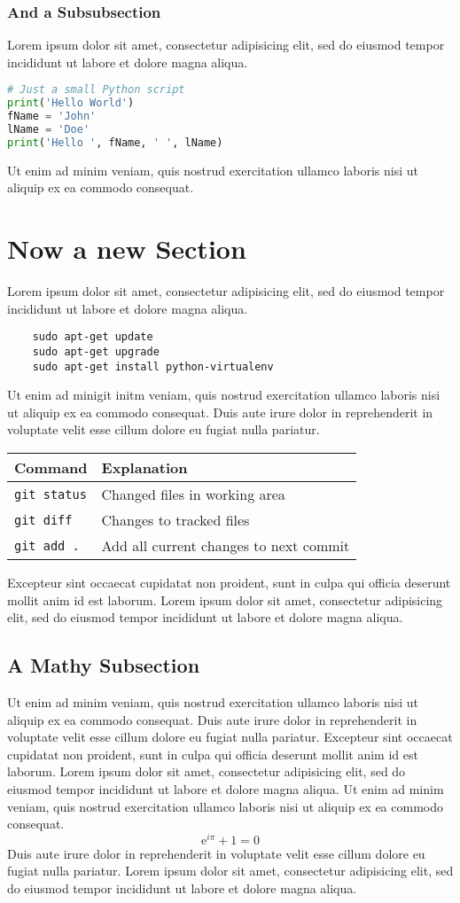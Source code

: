 \documentclass{modernCS}
\begin{document}
\subsubsection{And a Subsubsection}
Lorem ipsum dolor sit amet, consectetur adipisicing elit, sed do eiusmod
tempor incididunt ut labore et dolore magna aliqua.
\begin{lstlisting}[language=Python]
# Just a small Python script
print('Hello World')
fName = 'John'
lName = 'Doe'
print('Hello ', fName, ' ', lName)
\end{lstlisting}
Ut enim ad minim veniam,
quis nostrud exercitation ullamco laboris nisi ut aliquip ex ea commodo
consequat.

\section{Now a new Section}
Lorem ipsum dolor sit amet, consectetur adipisicing elit, sed do eiusmod
tempor incididunt ut labore et dolore magna aliqua.
\begin{lstlisting}
	sudo apt-get update
	sudo apt-get upgrade
	sudo apt-get install python-virtualenv
\end{lstlisting}
Ut enim ad minigit initm veniam,
quis nostrud exercitation ullamco laboris nisi ut aliquip ex ea commodo
consequat. Duis aute irure dolor in reprehenderit in voluptate velit esse
cillum dolore eu fugiat nulla pariatur.
\begin{center}
\begin{tabular}{ll}
\toprule
Command & Explanation \\
\midrule
\verb+git status+ & Changed files in working area \\
\verb+git diff+ & Changes to tracked files \\
\verb+git add .+ & Add all current changes to next commit \\
\bottomrule
\end{tabular}
\end{center}
Excepteur sint occaecat cupidatat non
proident, sunt in culpa qui officia deserunt mollit anim id est laborum.
Lorem ipsum dolor sit amet, consectetur adipisicing elit, sed do eiusmod
tempor incididunt ut labore et dolore magna aliqua.
\subsection{A Mathy Subsection}
Ut enim ad minim veniam,
quis nostrud exercitation ullamco laboris nisi ut aliquip ex ea commodo
consequat. Duis aute irure dolor in reprehenderit in voluptate velit esse
cillum dolore eu fugiat nulla pariatur. Excepteur sint occaecat cupidatat non
proident, sunt in culpa qui officia deserunt mollit anim id est laborum.
Lorem ipsum dolor sit amet, consectetur adipisicing elit, sed do eiusmod
tempor incididunt ut labore et dolore magna aliqua. Ut enim ad minim veniam,
quis nostrud exercitation ullamco laboris nisi ut aliquip ex ea commodo
consequat.
\[
\mathrm{e}^{i\pi} + 1 = 0
\]
Duis aute irure dolor in reprehenderit in voluptate velit esse
cillum dolore eu fugiat nulla pariatur.
Lorem ipsum dolor sit amet, consectetur adipisicing elit, sed do eiusmod
tempor incididunt ut labore et dolore magna aliqua.
\end{document}

